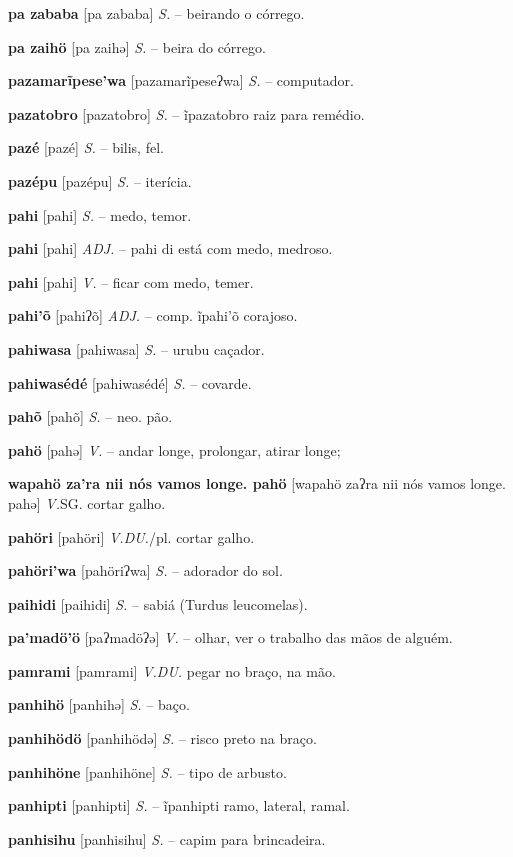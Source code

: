 \textbf{pa zababa} [pa zababa] \textit{S.} -- beirando o córrego.

\textbf{pa zaihö} [pa zaihə] \textit{S.} -- beira do córrego.

\textbf{pazamarĩpese'wa} [pazamarĩpeseʔwa] \textit{S.} -- computador.

\textbf{pazatobro} [pazatobro] \textit{S.} -- ĩpazatobro raiz para remédio.

\textbf{pazé} [pazé] \textit{S.} -- bilis, fel.

\textbf{pazépu} [pazépu] \textit{S.} -- iterícia.

\textbf{pahi} [pahi] \textit{S.} -- medo, temor.

\textbf{pahi} [pahi] \textit{ADJ.} -- pahi di está com medo, medroso.

\textbf{pahi} [pahi] \textit{V.} -- ficar com medo, temer.

\textbf{pahi'õ} [pahiʔõ] \textit{ADJ.} -- comp. ĩpahi'õ corajoso.

\textbf{pahiwasa} [pahiwasa] \textit{S.} -- urubu caçador.

\textbf{pahiwasédé} [pahiwasédé] \textit{S.} -- covarde.

\textbf{pahõ} [pahõ] \textit{S.} -- neo. pão.

\textbf{pahö} [pahə] \textit{V.} -- andar longe, prolongar, atirar longe;

\textbf{wapahö za'ra nii nós vamos longe. pahö} [wapahö zaʔra nii nós vamos longe. pahə] \textit{V.}SG. cortar galho.

\textbf{pahöri} [pahöri] \textit{V.DU.}/pl. cortar galho.

\textbf{pahöri'wa} [pahöriʔwa] \textit{S.} -- adorador do sol.

\textbf{paihidi} [paihidi] \textit{S.} -- sabiá (Turdus leucomelas).

\textbf{pa'madö'ö} [paʔmadöʔə] \textit{V.} -- olhar, ver o trabalho das mãos de alguém.

\textbf{pamrami} [pamrami] \textit{V.DU.} pegar no braço, na mão.

\textbf{panhihö} [panhihə] \textit{S.} -- baço.

\textbf{panhihödö} [panhihödə] \textit{S.} -- risco preto na braço.

\textbf{panhihöne} [panhihöne] \textit{S.} -- tipo de arbusto.

\textbf{panhipti} [panhipti] \textit{S.} -- ĩpanhipti ramo, lateral, ramal.

\textbf{panhisihu} [panhisihu] \textit{S.} -- capim para brincadeira.

